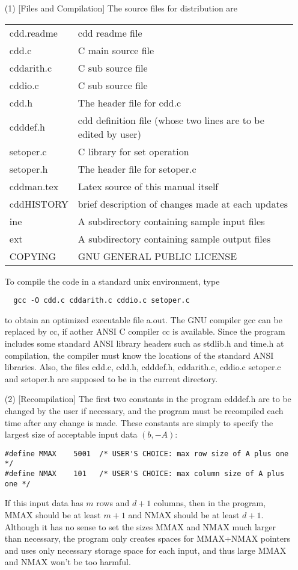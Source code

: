\begin{itemize}
\item[(1)] [Files and Compilation] The source files for distribution are

\begin{tabular}{ll}
     cdd.readme  &  cdd readme file\\
     cdd.c       &   C main source file\\
     cddarith.c  &   C sub source file\\  
     cddio.c  &   C sub source file\\  
     cdd.h       &   The header file for cdd.c\\
     cdddef.h    &   cdd definition file (whose two lines are to be edited by user)\\
     setoper.c   &   C library for set operation\\
     setoper.h   &   The header file for setoper.c \\
     cddman.tex  &  Latex source of this manual itself\\
     cddHISTORY  &   brief description of changes made at each updates\\
     ine         &   A subdirectory containing sample input files\\
     ext         &   A subdirectory containing sample output files\\
     COPYING     &   GNU GENERAL PUBLIC LICENSE
\end{tabular}

\noindent
To compile the code in a standard unix environment, type
\begin{verbatim}
  gcc -O cdd.c cddarith.c cddio.c setoper.c
\end{verbatim}

to obtain an optimized executable file a.out. The GNU compiler
gcc can be replaced by cc, if aother ANSI  C compiler cc is available.
Since the program includes some standard ANSI library 
headers such as stdlib.h and time.h at compilation, 
the compiler must know the locations of the standard ANSI libraries.
Also, the files cdd.c, cdd.h, cdddef.h, cddarith.c, cddio.c setoper.c and 
setoper.h are supposed to be
in the current directory.

\item[(2)] [Recompilation] The first two constants in the program cdddef.h are to be 
changed by the user if necessary, and the program must be recompiled
each time after any change is made.   These constants are simply
to specify the largest size of acceptable input data $(b, -A)$: 
\begin{verbatim}
#define MMAX    5001  /* USER'S CHOICE: max row size of A plus one */
#define NMAX    101   /* USER'S CHOICE: max column size of A plus one */
\end{verbatim}
If this input data has $m$ rows and $d+1$ columns, then in the program,
MMAX should be at least $m+1$ and NMAX should be at least
$d+1$.  Although it has no sense to set the sizes MMAX and NMAX much larger
than necessary, the program only creates spaces for MMAX+NMAX pointers
and uses only necessary storage space for each input, and
thus large MMAX and NMAX won't be too harmful.


\end{itemize}
